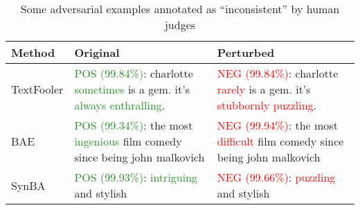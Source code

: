 \begin{table}[h]
    \footnotesize
    \centering
    \begin{tabularx}{\textwidth}{|l|X|X|}
    \hline
    Method   &   Original    &   Perturbed\\ \hline\hline
    TextFooler & \textcolor{ForestGreen}{POS (99.84\%)}: charlotte \textcolor{ForestGreen}{sometimes} is a gem. it's \textcolor{ForestGreen}{always enthralling}.  & \textcolor{red}{NEG (99.84\%)}: charlotte \textcolor{red}{rarely} is a gem. it's \textcolor{red}{stubbornly puzzling}. \\ \hline
    BAE &  \textcolor{ForestGreen}{POS (99.34\%)}: the most \textcolor{ForestGreen}{ingenious} film comedy since being john malkovich  & \textcolor{red}{NEG (99.94\%)}: the most \textcolor{red}{difficult} film comedy since being john malkovich \\ \hline
    SynBA & \textcolor{ForestGreen}{POS (99.93\%)}: \textcolor{ForestGreen}{intriguing} and stylish  & \textcolor{red}{NEG (99.66\%)}: \textcolor{red}{puzzling} and stylish  \\ \hline
\end{tabularx}
    \caption{Some adversarial examples annotated as “inconsistent” by human judges}
    \label{tab:inconsistent-examples}
\end{table}

